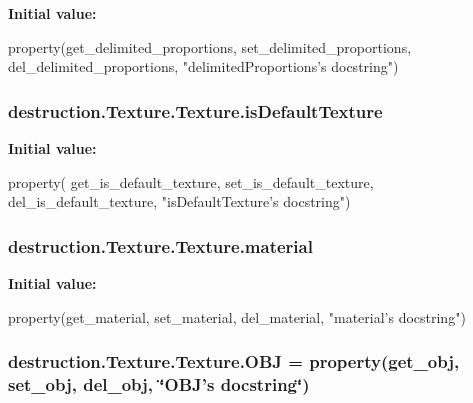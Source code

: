 {\bfseries Initial value\-:}
\begin{DoxyCode}
property(get\_delimited\_proportions,
                                     set\_delimited\_proportions,
                                      del\_delimited\_proportions,
                                       \textcolor{stringliteral}{"delimitedProportions's docstring"})
\end{DoxyCode}
\hypertarget{classdestruction_1_1_texture_1_1_texture_a214cb8653c99c7aa1df9d41d09de7009}{
\subsubsection[{is\-Default\-Texture}]{\setlength{\rightskip}{0pt plus 5cm}destruction.\-Texture.\-Texture.\-is\-Default\-Texture\hspace{0.3cm}{\ttfamily [static]}}}\label{classdestruction_1_1_texture_1_1_texture_a214cb8653c99c7aa1df9d41d09de7009}
{\bfseries Initial value\-:}
\begin{DoxyCode}
property(
                                get\_is\_default\_texture, set\_is\_default\_texture,
                                 del\_is\_default\_texture, \textcolor{stringliteral}{"isDefaultTexture's
       docstring"})
\end{DoxyCode}
\hypertarget{classdestruction_1_1_texture_1_1_texture_a4b3342c3c281c49eeb86276397d45659}{
\subsubsection[{material}]{\setlength{\rightskip}{0pt plus 5cm}destruction.\-Texture.\-Texture.\-material\hspace{0.3cm}{\ttfamily [static]}}}\label{classdestruction_1_1_texture_1_1_texture_a4b3342c3c281c49eeb86276397d45659}
{\bfseries Initial value\-:}
\begin{DoxyCode}
property(get\_material, set\_material, del\_material,
                         \textcolor{stringliteral}{"material's docstring"})
\end{DoxyCode}
\hypertarget{classdestruction_1_1_texture_1_1_texture_a430df2978ed649f6b9af6c458a86951f}{
\subsubsection[{O\-B\-J}]{\setlength{\rightskip}{0pt plus 5cm}destruction.\-Texture.\-Texture.\-O\-B\-J = property({\bf get\-\_\-obj}, {\bf set\-\_\-obj}, {\bf del\-\_\-obj}, \char`\"{}O\-B\-J's docstring\char`\"{})\hspace{0.3cm}{\ttfamily [static]}}}\label{classdestruction_1_1_texture_1_1_texture_a430df2978ed649f6b9af6c458a86951f}

